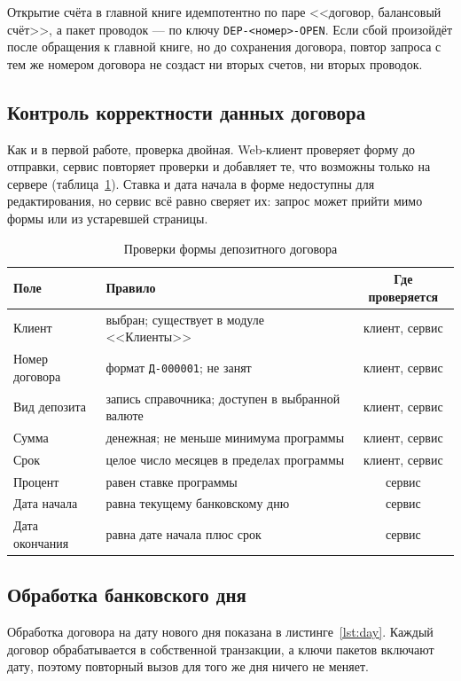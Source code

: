\documentclass[14pt,a4paper]{extarticle}
\begin{document}
Открытие счёта в главной книге идемпотентно по паре <<договор, балансовый счёт>>, а пакет
проводок --- по ключу \texttt{DEP-<номер>-OPEN}. Если сбой произойдёт после обращения к
главной книге, но до сохранения договора, повтор запроса с тем же номером договора не
создаст ни вторых счетов, ни вторых проводок.

\subsection{Контроль корректности данных договора}

Как и в первой работе, проверка двойная. Web-клиент проверяет форму до отправки, сервис
повторяет проверки и добавляет те, что возможны только на сервере
(таблица~\ref{tab:checks}). Ставка и дата начала в форме недоступны для редактирования,
но сервис всё равно сверяет их: запрос может прийти мимо формы или из устаревшей страницы.

\begin{table}[H]
\caption{Проверки формы депозитного договора}
\label{tab:checks}
\centering
\small
\begin{tabularx}{\textwidth}{lXc}
\toprule
Поле & Правило & Где проверяется \\
\midrule
Клиент & выбран; существует в модуле <<Клиенты>> & клиент, сервис \\
Номер договора & формат \texttt{Д-000001}; не занят & клиент, сервис \\
Вид депозита & запись справочника; доступен в выбранной валюте & клиент, сервис \\
Сумма & денежная; не меньше минимума программы & клиент, сервис \\
Срок & целое число месяцев в пределах программы & клиент, сервис \\
Процент & равен ставке программы & сервис \\
Дата начала & равна текущему банковскому дню & сервис \\
Дата окончания & равна дате начала плюс срок & сервис \\
\bottomrule
\end{tabularx}
\end{table}

\subsection{Обработка банковского дня}

Обработка договора на дату нового дня показана в листинге~\ref{lst:day}. Каждый договор
обрабатывается в собственной транзакции, а ключи пакетов включают дату, поэтому повторный
вызов для того же дня ничего не меняет.
\end{document}
